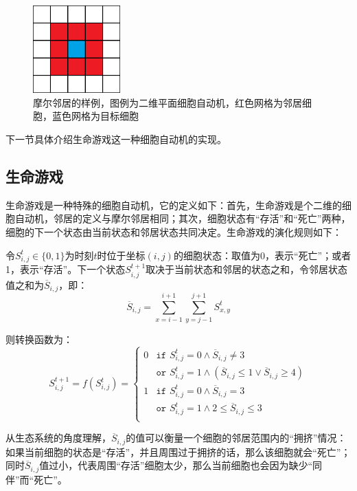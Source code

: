 \documentclass[a4paper,12pt]{article}
\begin{document}
\begin{figure}[!ht]
\centering
\includegraphics[width=0.3\textwidth]{images/CA-Moore.png}
\caption{摩尔邻居的样例，图例为二维平面细胞自动机，红色网格为邻居细胞，蓝色网格为目标细胞}
\label{fig:moore}
\end{figure}

下一节具体介绍生命游戏这一种细胞自动机的实现。

\subsection{生命游戏}\label{sec:gol}

生命游戏是一种特殊的细胞自动机，它的定义如下：首先，生命游戏是个二维的细胞自动机，邻居的定义与摩尔邻居相同；其次，细胞状态有“存活”和“死亡”两种，细胞的下一个状态由当前状态和邻居状态共同决定。生命游戏的演化规则如下：

令$S_{i,j}^t \in \{ 0, 1 \}$为时刻$t$时位于坐标$(i,j)$的细胞状态：取值为0，表示“死亡”；或者1，表示“存活”。下一个状态$S_{i,j}^{t+1}$取决于当前状态和邻居的状态之和，令邻居状态值之和为$\overline{S}_{i,j}$，即：
$$
\overline{S}_{i,j} = \sum_{x=i-1}^{i+1} \sum_{y=j-1}^{j+1} S_{x,y}^t 
$$

则转换函数为：
\begin{equation}\label{eq:mapping}
S_{i,j}^{t+1} = f(S_{i,j}^t) = 
\begin{cases}
0 & \texttt{if } S_{i,j}^t = 0 \wedge  \overline{S}_{i,j} \neq 3 \\
  & \texttt{or } S_{i,j}^t = 1 \wedge (\overline{S}_{i,j} \leq 1 \vee \overline{S}_{i,j} \geq 4) \\
1 & \texttt{if } S_{i,j}^t = 0 \wedge \overline{S}_{i,j} = 3 \\
  & \texttt{or } S_{i,j}^t = 1 \wedge 2 \leq \overline{S}_{i,j} \leq 3 \\
\end{cases}
\end{equation}

从生态系统的角度理解，$\overline{S}_{i,j}$的值可以衡量一个细胞的邻居范围内的“拥挤”情况：如果当前细胞的状态是“存活”，并且周围过于拥挤的话，那么该细胞就会“死亡”；同时$\overline{S}_{i,j}$值过小，代表周围“存活”细胞太少，那么当前细胞也会因为缺少“同伴”而“死亡”。
\end{document}
